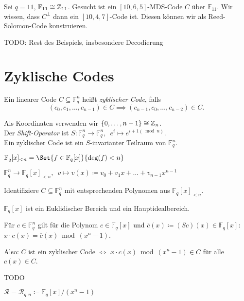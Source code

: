 \documentclass{cheat-sheet}
\newcommand{\F}{\mathbb{F}} %
\begin{document}
\begin{bsp}
  Sei $q = 11$, $\F_{11} \cong \Z_{11}$.
  Gesucht ist ein $[10, 6, 5]$-MDS-Code $C$ über $\F_{11}$.
  Wir wissen, dass $C^\perp$ dann ein $[10, 4, 7]$-Code ist.
  Diesen können wir als Reed-Solomon-Code konstruieren.
\end{bsp}

TODO: Rest des Beispiels, insbesondere Decodierung


\section{Zyklische Codes}


\begin{defn}
  Ein linearer Code $C \subseteq \F_q^n$ heißt \emph{zyklischer Code}, falls
  \[
    (c_0, c_1, \ldots, c_{n-1}) \in C \implies
    (c_{n-1}, c_0, \ldots, c_{n-2}) \in C.
  \]
\end{defn}

\begin{bem}
  Als Koordinaten verwenden wir $\{ 0, \ldots, n-1 \} \cong \mathbb{Z}_n$. \\
  Der \emph{Shift-Operator} ist $S : \F_q^n \to \F_q^n, \enspace e^i \mapsto e^{i+1 (\bmod{n})}$. \\
  Ein zyklischer Code ist ein $S$-invarianter Teilraum von $\F_q^n$.
\end{bem}

$\F_q[x]_{< n} = \Set{f \in \F_q[x]}{\deg(f) < n}$

$\F_q^n \to \F_q[x]_{< n}, \enspace v \mapsto v(x) \coloneqq v_0 + v_1 x + \ldots + v_{n-1} x^{n-1}$

Identifiziere $C \subseteq \F_q^n$ mit entsprechenden Polynomen aus $\F_q[x]_{< n}$.

$\F_q[x]$ ist ein Euklidischer Bereich und ein Hauptidealbereich.

Für $c \in \F_q^n$ gilt für die Polynom $c \in \F_q[x]$ und $\overline{c}(x) \coloneqq (S c)(x) \in \F_q[x]$:
$x \cdot c(x) = \overline{c}(x) \bmod{(x^n - 1)}$.

Also: $C$ ist ein zyklischer Code $\iff$ $x \cdot c(x) \bmod{(x^n - 1)} \in C$ für alle $c(x) \in C$.

\begin{bem}
  TODO
\end{bem}

\begin{nota}
  $\mathcal{R} = \mathcal{R}_{q,n} \coloneqq \F_q[x] / (x^n - 1)$
\end{nota}
\end{document}
